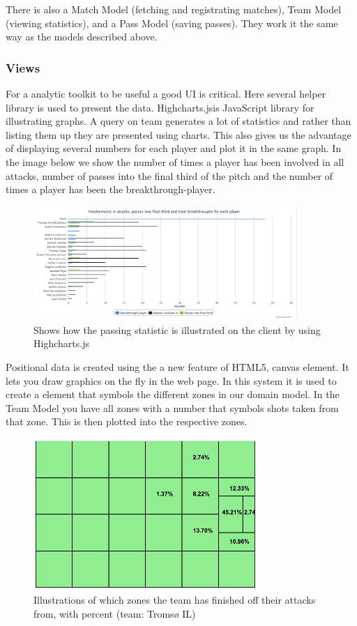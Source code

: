 There is also a Match Model (fetching and registrating matches), Team Model (viewing statistics), and a Pass Model (saving passes). They work it the same way as the models described above.


\subsubsection{Views}

For a analytic toolkit to be useful a good UI is critical. Here several helper library is used to present the data. Highcharts.js\footnotemark is JavaScript library for illustrating graphs. A query on team generates a lot of statistics and rather than listing them up they are presented using charts. This also gives us the advantage of displaying several numbers for each player and plot it in the same graph. In the image below we show the number of times a player has been involved in all attacks, number of passes into the final third of the pitch and the number of times a player has been the breakthrough-player.


\begin{figure}[ht!]
\centering
\includegraphics[width=100mm]{images/general/chart_passes.png}
\caption{Shows how the passing statistic is illustrated on the client by using Highcharts.js}
\label{overflow}
\end{figure}

Positional data is created using the a new feature of HTML5, canvas element. It lets you draw graphics on the fly in the web page. In this system it is used to create a element that symbols the different zones in our domain model. In the Team Model you have all zones with a number that symbols shots taken from that zone. This is then plotted into the respective zones.

\begin{figure}[ht!]
\centering
\includegraphics[width=85mm]{images/general/finishing_zones.png}
\caption{Illustrations of which zones the team has finished off their attacks from, with percent (team: Tromsø IL)}
\label{overflow}
\end{figure}

